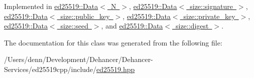 Implemented in \mbox{\hyperlink{classed25519_1_1_data_ac365c9862b45379c677449b622c74da5}{ed25519\+::\+Data$<$ N $>$}}, \mbox{\hyperlink{classed25519_1_1_data_ac365c9862b45379c677449b622c74da5}{ed25519\+::\+Data$<$ size\+::signature $>$}}, \mbox{\hyperlink{classed25519_1_1_data_ac365c9862b45379c677449b622c74da5}{ed25519\+::\+Data$<$ size\+::public\+\_\+key $>$}}, \mbox{\hyperlink{classed25519_1_1_data_ac365c9862b45379c677449b622c74da5}{ed25519\+::\+Data$<$ size\+::private\+\_\+key $>$}}, \mbox{\hyperlink{classed25519_1_1_data_ac365c9862b45379c677449b622c74da5}{ed25519\+::\+Data$<$ size\+::seed $>$}}, and \mbox{\hyperlink{classed25519_1_1_data_ac365c9862b45379c677449b622c74da5}{ed25519\+::\+Data$<$ size\+::digest $>$}}.



The documentation for this class was generated from the following file\+:\begin{DoxyCompactItemize}
\item 
/\+Users/denn/\+Development/\+Dehancer/\+Dehancer-\/\+Services/ed25519cpp/include/\mbox{\hyperlink{ed25519_8hpp}{ed25519.\+hpp}}\end{DoxyCompactItemize}
